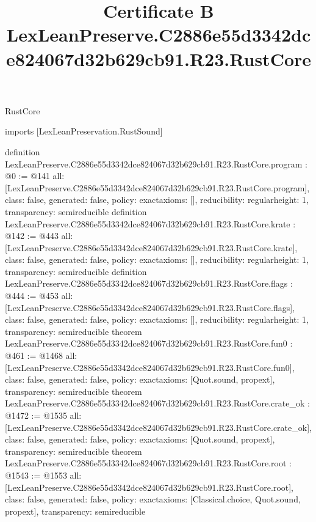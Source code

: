 \begin{lexlean}{RustCore}
\title{Certificate B LexLeanPreserve.C2886e55d3342dce824067d32b629cb91.R23.RustCore}
\begin{coremodule}
imports [LexLeanPreservation.RustSound]

definition LexLeanPreserve.C2886e55d3342dce824067d32b629cb91.R23.RustCore.program : @0 := @141 {
  all: [LexLeanPreserve.C2886e55d3342dce824067d32b629cb91.R23.RustCore.program],
  class: false,
  generated: false,
  policy: exact{axioms: []},
  reducibility: regular{height: 1},
  transparency: semireducible
}
definition LexLeanPreserve.C2886e55d3342dce824067d32b629cb91.R23.RustCore.krate : @142 := @443 {
  all: [LexLeanPreserve.C2886e55d3342dce824067d32b629cb91.R23.RustCore.krate],
  class: false,
  generated: false,
  policy: exact{axioms: []},
  reducibility: regular{height: 1},
  transparency: semireducible
}
definition LexLeanPreserve.C2886e55d3342dce824067d32b629cb91.R23.RustCore.flags : @444 := @453 {
  all: [LexLeanPreserve.C2886e55d3342dce824067d32b629cb91.R23.RustCore.flags],
  class: false,
  generated: false,
  policy: exact{axioms: []},
  reducibility: regular{height: 1},
  transparency: semireducible
}
theorem LexLeanPreserve.C2886e55d3342dce824067d32b629cb91.R23.RustCore.fun0 : @461 := @1468 {
  all: [LexLeanPreserve.C2886e55d3342dce824067d32b629cb91.R23.RustCore.fun0],
  class: false,
  generated: false,
  policy: exact{axioms: [Quot.sound, propext]},
  transparency: semireducible
}
theorem LexLeanPreserve.C2886e55d3342dce824067d32b629cb91.R23.RustCore.crate_ok : @1472 := @1535 {
  all: [LexLeanPreserve.C2886e55d3342dce824067d32b629cb91.R23.RustCore.crate_ok],
  class: false,
  generated: false,
  policy: exact{axioms: [Quot.sound, propext]},
  transparency: semireducible
}
theorem LexLeanPreserve.C2886e55d3342dce824067d32b629cb91.R23.RustCore.root : @1543 := @1553 {
  all: [LexLeanPreserve.C2886e55d3342dce824067d32b629cb91.R23.RustCore.root],
  class: false,
  generated: false,
  policy: exact{axioms: [Classical.choice, Quot.sound, propext]},
  transparency: semireducible
}


\end{coremodule}
\end{lexlean}
